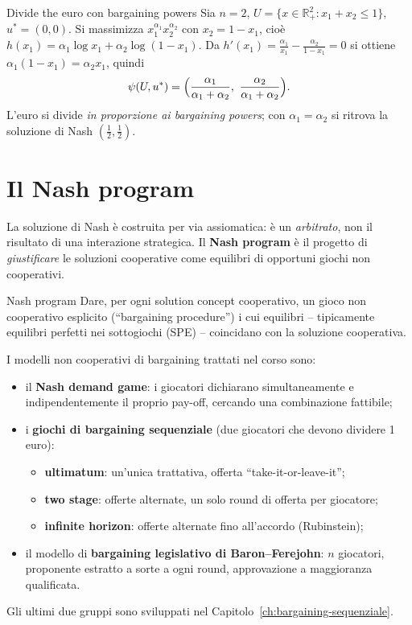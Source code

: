 \documentclass[12pt,a4paper,twoside]{book}
\theoremstyle{plain}
\theoremstyle{definition}
\begin{document}
\begin{exbox}{Divide the euro con bargaining powers}
Sia $n=2$, $U=\{x\in\mathbb{R}^2_+ : x_1+x_2\le1\}$, $u^*=(0,0)$. Si massimizza
$x_1^{\alpha_1}x_2^{\alpha_2}$ con $x_2=1-x_1$, cioè
$h(x_1)=\alpha_1\log x_1+\alpha_2\log(1-x_1)$. Da $h'(x_1)=\frac{\alpha_1}{x_1}-\frac{\alpha_2}{1-x_1}=0$
si ottiene $\alpha_1(1-x_1)=\alpha_2x_1$, quindi
\[
  \psi(U,u^*)=\Bigl(\frac{\alpha_1}{\alpha_1+\alpha_2},\ \frac{\alpha_2}{\alpha_1+\alpha_2}\Bigr).
\]
L'euro si divide \emph{in proporzione ai bargaining powers}; con $\alpha_1=\alpha_2$ si
ritrova la soluzione di Nash $(\tfrac12,\tfrac12)$.
\end{exbox}

\section{Il Nash program}

La soluzione di Nash è costruita per via assiomatica: è un \emph{arbitrato}, non il
risultato di una interazione strategica. Il \textbf{Nash program} è il progetto di
\emph{giustificare} le soluzioni cooperative come equilibri di opportuni giochi
non cooperativi.

\begin{defbox}{Nash program}
Dare, per ogni solution concept cooperativo, un gioco non cooperativo esplicito
(``bargaining procedure'') i cui equilibri -- tipicamente equilibri perfetti nei sottogiochi
(SPE) -- coincidano con la soluzione cooperativa.
\end{defbox}

I modelli non cooperativi di bargaining trattati nel corso sono:
\begin{itemize}
  \item il \textbf{Nash demand game}: i giocatori dichiarano simultaneamente e
        indipendentemente il proprio pay-off, cercando una combinazione fattibile;
  \item i \textbf{giochi di bargaining sequenziale} (due giocatori che devono dividere 1
        euro):
        \begin{itemize}
          \item \textbf{ultimatum}: un'unica trattativa, offerta ``take-it-or-leave-it'';
          \item \textbf{two stage}: offerte alternate, un solo round di offerta per giocatore;
          \item \textbf{infinite horizon}: offerte alternate fino all'accordo (Rubinstein);
        \end{itemize}
  \item il modello di \textbf{bargaining legislativo di Baron--Ferejohn}: $n$ giocatori,
        proponente estratto a sorte a ogni round, approvazione a maggioranza qualificata.
\end{itemize}
Gli ultimi due gruppi sono sviluppati nel Capitolo~\ref{ch:bargaining-sequenziale}.
\end{document}
